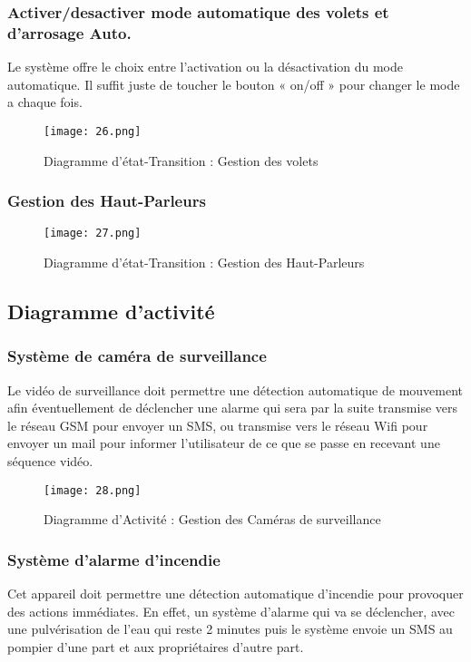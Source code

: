 \begin{spacing}{1.2}
\subsubsection{Activer/desactiver mode automatique des volets et d’arrosage Auto.}
Le système offre le choix entre l’activation ou la désactivation du mode automatique.
Il suffit juste de toucher le bouton « on/off » pour changer le mode a chaque fois.
\begin{figure}[H]\centering
\texttt{[image: 26.png]}
\caption{Diagramme d'état-Transition : Gestion des volets}
\label{fig:fig3}
\end{figure}

\subsubsection{Gestion des Haut-Parleurs}
\begin{figure}[H]\centering
\texttt{[image: 27.png]}
\caption{Diagramme d'état-Transition : Gestion des Haut-Parleurs}
\label{fig:fig3}
\end{figure}
 
 
 
\subsection{Diagramme d’activité }
\subsubsection{Système de caméra de surveillance }
Le vidéo de surveillance doit permettre une détection automatique de mouvement afin éventuellement de déclencher une alarme qui sera par la suite transmise vers le réseau GSM pour envoyer un SMS, ou transmise vers le réseau Wifi pour envoyer un mail pour informer l’utilisateur de ce que se passe en recevant une séquence vidéo.  

\begin{figure}[H]\centering
\texttt{[image: 28.png]}
\caption{Diagramme d'Activité : Gestion des Caméras de surveillance}
\label{fig:fig3}
\end{figure}
 
 \newpage
\subsubsection{Système d’alarme d’incendie}
Cet appareil doit permettre une détection automatique d’incendie pour provoquer des actions immédiates.
En effet, un système d’alarme qui va se déclencher, avec une pulvérisation de l’eau qui reste 2 minutes puis le système envoie un SMS au pompier d’une part et aux propriétaires d’autre part. 


\end{spacing}
